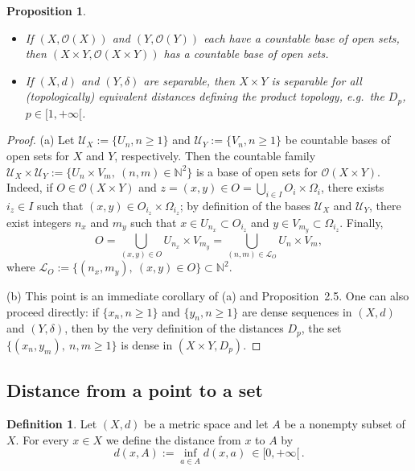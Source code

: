 \documentclass[11pt]{article}
\newtheorem{proposition}{Proposition}[section]
\theoremstyle{definition}
\newtheorem{definition}{Definition}[section]
\begin{document}
\begin{proposition}
\begin{itemize}[leftmargin=1.5em]
\item[(a)] If $(X,\mathcal{O}(X))$ and $(Y,\mathcal{O}(Y))$ each have a countable base of open sets, then $(X\times Y,\mathcal{O}(X\times Y))$ has a countable base of open sets.
\item[(b)] If $(X,d)$ and $(Y,\delta)$ are separable, then $X\times Y$ is separable for all (topologically) equivalent distances defining the product topology, e.g.\ the $D_p$, $p\in[1,+\infty[$.
\end{itemize}
\end{proposition}

\begin{proof}
(a) Let $\mathcal{U}_X:=\{U_n, n\ge 1\}$ and $\mathcal{U}_Y:=\{V_n, n\ge 1\}$ be countable bases of open sets for $X$ and $Y$, respectively.
Then the countable family $\mathcal{U}_X\times\mathcal{U}_Y:=\{U_n\times V_m,\ (n,m)\in\mathbb{N}^2\}$ is a base of open sets for $\mathcal{O}(X\times Y)$.
Indeed, if $O\in\mathcal{O}(X\times Y)$ and $z=(x,y)\in O=\bigcup_{i\in I} O_i\times\Omega_i$, there exists $i_z\in I$ such that $(x,y)\in O_{i_z}\times\Omega_{i_z}$; by definition of the bases $\mathcal{U}_X$ and $\mathcal{U}_Y$, there exist integers $n_x$ and $m_y$ such that $x\in U_{n_x}\subset O_{i_z}$ and $y\in V_{m_y}\subset \Omega_{i_z}$.
Finally,
\[
O=\bigcup_{(x,y)\in O} U_{n_x}\times V_{m_y}=\bigcup_{(n,m)\in\mathcal{L}_O} U_n\times V_m,
\]
where $\mathcal{L}_O:=\{(n_x,m_y),\ (x,y)\in O\}\subset\mathbb{N}^2$.

(b) This point is an immediate corollary of (a) and Proposition~2.5.
One can also proceed directly: if $\{x_n, n\ge 1\}$ and $\{y_n, n\ge 1\}$ are dense sequences in $(X,d)$ and $(Y,\delta)$, then by the very definition of the distances $D_p$, the set $\{(x_n,y_m),\ n,m\ge 1\}$ is dense in $(X\times Y, D_p)$.
\end{proof}

\subsection{Distance from a point to a set}

\begin{definition}
Let $(X,d)$ be a metric space and let $A$ be a nonempty subset of $X$.
For every $x\in X$ we define the distance from $x$ to $A$ by
\[
d(x,A):=\inf_{a\in A} d(x,a)\ \in [0,+\infty[\, .
\]
\end{definition}
\end{document}
